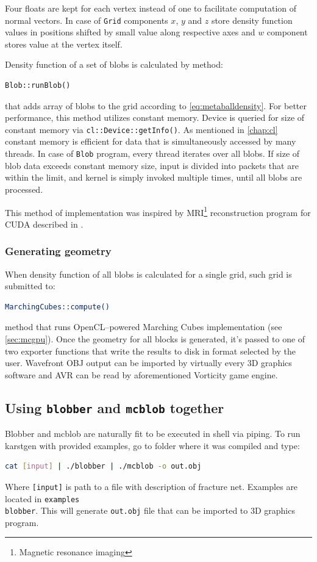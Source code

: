 Four floats are kept for each vertex instead of one to facilitate computation of
normal vectors. In case of \texttt{Grid} components $x$, $y$ and
$z$ store density function values in positions shifted by small value along
respective axes and $w$ component stores value at the vertex itself.

Density function of a set of blobs is calculated by method:
\begin{lstlisting}[numbers=none]
Blob::runBlob()
\end{lstlisting}
that adds array of blobs to the grid according to \autoref{eq:metaballdensity}.
For better performance, this method utilizes constant memory. Device is queried
for size of constant memory via \texttt{cl::Device::getInfo()}. As
mentioned in \autoref{chap:cl} constant memory is efficient for data that is
simultaneously accessed by many threads. In case of \texttt{Blob} program,
every thread iterates over all blobs. If size of blob data exceeds constant
memory size, input is divided into packets that are within the limit, and kernel
is simply invoked multiple times, until all blobs are processed.

This method of implementation was inspired by MRI\footnote{Magnetic resonance imaging}
reconstruction program for CUDA described in \cite[in chapter~8]{Kirk:2010:PMP:1841511}.

\subsubsection{Generating geometry}

When density function of all blobs is calculated for a single grid, such grid
is submitted to:
\begin{lstlisting}[language=bash,numbers=none]
MarchingCubes::compute()
\end{lstlisting}
method that runs OpenCL--powered
Marching Cubes implementation (see \autoref{sec:mcgpu}). Once the geometry for
all blocks is generated, it's passed to one of two exporter functions that write
the results to disk in format selected by the user. Wavefront OBJ output can be
imported by virtually every 3D graphics software and AVR can be read by aforementioned
Vorticity game engine.

\subsection{Using \texttt{blobber} and \texttt{mcblob} together}

Blobber and mcblob are naturally fit to be executed in shell via piping. To
run karstgen with provided examples, go to folder where it was compiled and
type:
\begin{lstlisting}[language=bash,numbers=none]
cat [input] | ./blobber | ./mcblob -o out.obj
\end{lstlisting}
Where \texttt{[input]} is path to a file with description of fracture net.
Examples are located in \texttt{examples\\blobber}.
This will generate \texttt{out.obj} file that can be imported to 3D graphics
program.

